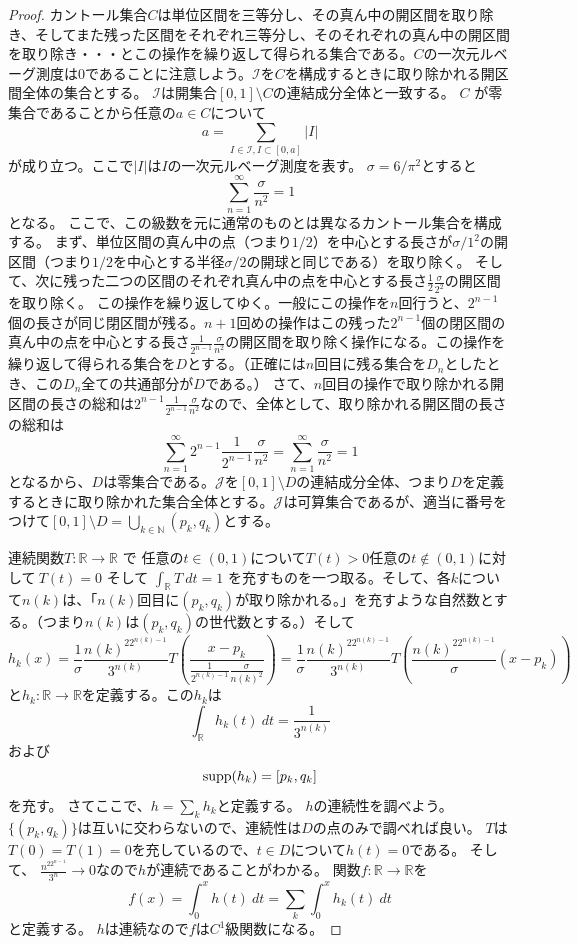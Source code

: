 \documentclass[leqno]{jsarticle}
\newcommand{\nn}{\mathbb{N}}
\newcommand{\rr}{\mathbb{R}}
\newcommand{\supp}{\text{{\rm supp}}}
\begin{document}
\begin{proof}
カントール集合$C$は単位区間を三等分し、その真ん中の開区間を取り除き、そしてまた残った区間をそれぞれ三等分し、そのそれぞれの真ん中の開区間を取り除き・・・とこの操作を繰り返して得られる集合である。$C$の一次元ルベーグ測度は$0$であることに注意しよう。$\mathcal{I}$を$C$を構成するときに取り除かれる開区間全体の集合とする。
$\mathcal{I}$は開集合$[0,1]\setminus C$の連結成分全体と一致する。
$C$ が零集合であることから任意の$a\in C$について
\[
a=\sum_{I\in \mathcal{I}, I\subset [0,a]}|I|
\]
が成り立つ。ここで$|I|$は$I$の一次元ルベーグ測度を表す。
$\sigma=6/\pi^2$とすると
\[
\sum_{n=1}^{\infty}\frac{\sigma}{n^2}=1
\]
となる。
ここで、この級数を元に通常のものとは異なるカントール集合を構成する。
まず、単位区間の真ん中の点（つまり$1/2$）を中心とする長さが$\sigma/1^2$の開区間（つまり$1/2$を中心とする半径$\sigma/2$の開球と同じである）を取り除く。
そして、次に残った二つの区間のそれぞれ真ん中の点を中心とする長さ$\frac{1}{2}\frac{\sigma}{2^2}$の開区間を取り除く。
この操作を繰り返してゆく。一般にこの操作を$n$回行うと、$2^{n-1}$個の長さが同じ閉区間が残る。$n+1$回めの操作はこの残った$2^{n-1}$個の閉区間の真ん中の点を中心とする長さ$\frac{1}{2^{n-1}}\frac{\sigma}{n^2}$の開区間を取り除く操作になる。この操作を繰り返して得られる集合を$D$とする。（正確には$n$回目に残る集合を$D_n$としたとき、この$D_n$全ての共通部分が$D$である。）
さて、$n$回目の操作で取り除かれる開区間の長さの総和は$2^{n-1}\frac{1}{2^{n-1}}\frac{\sigma}{n^2}$なので、全体として、取り除かれる開区間の長さの総和は
\[
\sum_{n=1}^{\infty}2^{n-1}\frac{1}{2^{n-1}}\frac{\sigma}{n^2}=\sum_{n=1}^{\infty}\frac{\sigma}{n^2}=1
\]
となるから、$D$は零集合である。$\mathcal{J}$を$[0,1]\setminus D$の連結成分全体、つまり$D$を定義するときに取り除かれた集合全体とする。$\mathcal{J}$は可算集合であるが、適当に番号をつけて$[0,1]\setminus D=\bigcup_{k\in \nn}(p_k,q_k)$とする。

連続関数$T:\rr\to \rr$ で 任意の$t\in (0,1)$について$T(t)>0$任意の$t\not \in (0,1)$に対して$\ T(t)=0$ そして $\int_{\rr} T\ dt=1$
を充すものを一つ取る。そして、各$k$について$n(k)$は、「$n(k)$回目に$(p_k,q_k)$が取り除かれる。」を充すような自然数とする。（つまり$n(k)$は$(p_k,q_k)$の世代数とする。）そして
\[
h_{k}(x)=\frac{1}{\sigma}\frac{n(k)^22^{n(k)-1}}{3^{n(k)}}T\left(\frac{x-p_k}{\frac{1}{2^{n(k)-1}}\frac{\sigma}{n(k)^2}}\right)
=\frac{1}{\sigma}\frac{n(k)^22^{n(k)-1}}{3^{n(k)}}T\left(\frac{n(k)^22^{n(k)-1}}{\sigma}(x-p_k)\right)
\]
と$h_k:\rr\to \rr$を定義する。この$h_k$は
\[
\int_{\rr} h_k(t)\ dt=\frac{1}{3^{n(k)}}
\]
および
\[
\supp (h_k)=[p_k,q_k]
\]
を充す。
さてここで、$h=\sum_{k}h_k$と定義する。
$h$の連続性を調べよう。
$\{(p_k,q_k)\}$は互いに交わらないので、連続性は$D$の点のみで調べれば良い。
$T$は$T(0)=T(1)=0$を充しているので、$t\in D$について$h(t)=0$である。
そして、
$\frac{n^22^{n-1}}{3^n}\to 0$なので$h$が連続であることがわかる。
関数$f:\rr\to \rr$を 
\[
f(x)=\int_{0}^{x}h(t)\ dt=\sum_k\int_{0}^{x}h_k(t)\ dt
\]
と定義する。
$h$は連続なので$f$は$C^1$級関数になる。


\end{proof}
\end{document}
